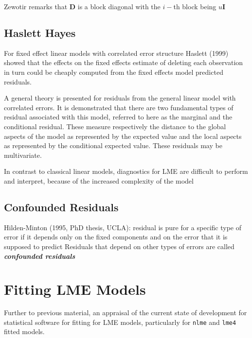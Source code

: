 \documentclass[12pt, a4paper]{report}
\theoremstyle{plain}
\theoremstyle{definition}
\theoremstyle{remark}
\begin{document}
	
	Zewotir remarks that $\boldsymbol{D}$ is a block diagonal with the $i-$th block being $u \boldsymbol{I}$
	\section{Haslett Hayes}                %
	
	For fixed effect linear models with correlated error structure
	Haslett (1999) showed that the effects on the fixed effects
	estimate of deleting each observation in turn could be cheaply
	computed from the fixed effects model predicted residuals.
	
	
	A general theory is presented for residuals from the general
	linear model with correlated errors. It is demonstrated that there
	are two fundamental types of residual associated with this model,
	referred to here as the marginal and the conditional residual.
	These measure respectively the distance to the global aspects of
	the model as represented by the expected value and the local
	aspects as represented by the conditional expected value. These
	residuals may be multivariate.
	
	In contrast to classical linear models, diagnostics for LME are
	difficult to perform and interpret, because of the increased
	complexity of the model
	
	\section{Confounded Residuals}
	Hilden-Minton (1995, PhD thesis, UCLA): residual is pure for a specific type of error if it depends only on the fixed components and
	on the error that it is supposed to predict	Residuals that depend on other types of errors are called \textit{\textbf{confounded
			residuals}}
	
	
	\chapter{Fitting LME Models}
	Further to previous material, an appraisal of the current state of development for statistical software for fitting for LME models, particularly for \texttt{nlme} and \texttt{lme4} fitted models.
	
\end{document}
